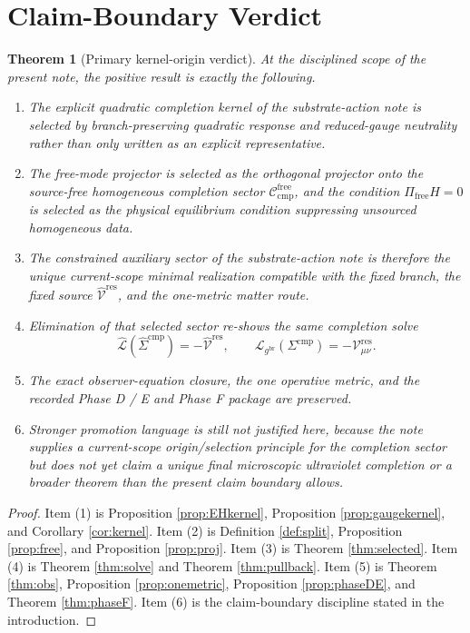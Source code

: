 \documentclass[11pt]{article}
\newcommand{\ObserverMetric}{g^{\mathrm{br}}}
\newcommand{\CompShift}{\Sigma^{\mathrm{cmp}}}
\newcommand{\CompLift}{\widehat\Sigma^{\mathrm{cmp}}}
\newcommand{\ResidualCore}{\mathcal V_{\mu\nu}^{\mathrm{res}}}
\newcommand{\ResidualLift}{\widehat{\mathcal V}^{\mathrm{res}}}
\newcommand{\SubReducedEin}{\widehat{\mathcal L}}
\newcommand{\FreeProj}{\Pi_{\mathrm{free}}}
\newcommand{\ReducedEin}{\mathcal L_{\ObserverMetric}}
\newcommand{\CompFree}{\mathscr C_{\mathrm{cmp}}^{\mathrm{free}}}
\newtheorem{theorem}{Theorem}
\begin{document}
\section{Claim-Boundary Verdict}

\begin{theorem}[Primary kernel-origin verdict]
\label{thm:verdict}
At the disciplined scope of the present note, the positive result is exactly the following.
\begin{enumerate}
    \item The explicit quadratic completion kernel of the substrate-action note is selected by branch-preserving quadratic response and reduced-gauge neutrality rather than only written as an explicit representative.
    \item The free-mode projector is selected as the orthogonal projector onto the source-free homogeneous completion sector \(\CompFree\), and the condition \(\FreeProj H=0\) is selected as the physical equilibrium condition suppressing unsourced homogeneous data.
    \item The constrained auxiliary sector of the substrate-action note is therefore the unique current-scope minimal realization compatible with the fixed branch, the fixed source \(\ResidualLift\), and the one-metric matter route.
    \item Elimination of that selected sector re-shows the same completion solve
    \[
    \SubReducedEin(\CompLift)=-\ResidualLift,
    \qquad
    \ReducedEin(\CompShift)=-\ResidualCore.
    \]
    \item The exact observer-equation closure, the one operative metric, and the recorded Phase D / E and Phase F package are preserved.
    \item Stronger promotion language is still not justified here, because the note supplies a current-scope origin/selection principle for the completion sector but does not yet claim a unique final microscopic ultraviolet completion or a broader theorem than the present claim boundary allows.
\end{enumerate}
\end{theorem}

\begin{proof}
Item (1) is Proposition \ref{prop:EHkernel}, Proposition \ref{prop:gaugekernel}, and Corollary \ref{cor:kernel}. Item (2) is Definition \ref{def:split}, Proposition \ref{prop:free}, and Proposition \ref{prop:proj}. Item (3) is Theorem \ref{thm:selected}. Item (4) is Theorem \ref{thm:solve} and Theorem \ref{thm:pullback}. Item (5) is Theorem \ref{thm:obs}, Proposition \ref{prop:onemetric}, Proposition \ref{prop:phaseDE}, and Theorem \ref{thm:phaseF}. Item (6) is the claim-boundary discipline stated in the introduction.
\end{proof}
\end{document}
